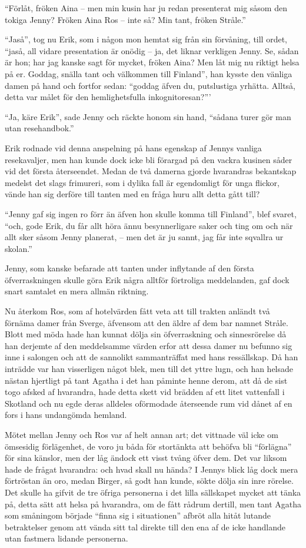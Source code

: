 ``Förlåt, fröken Aina -- men min kusin har ju redan presenterat mig
såsom den tokiga Jenny? Fröken Aina Ros -- inte så? Min tant, fröken
Stråle.''

``Jaså'', tog nu Erik, som i någon mon hemtat sig från sin förvåning,
till ordet, ``jaså, all vidare presentation är onödig -- ja, det liknar
verkligen Jenny. Se, sådan är hon; har jag kanske sagt för mycket,
fröken Aina? Men låt mig nu riktigt helsa på er. Goddag, snälla tant och
välkommen till Finland'', han kysste den vänliga damen på hand och
fortfor sedan: ``goddag äfven du, putslustiga yrhätta. Alltså, detta var
målet för den hemlighetsfulla inkognitoresan?'''

``Ja, käre Erik'', sade Jenny och räckte honom sin hand, ``sådana turer
gör man utan resehandbok.''

Erik rodnade vid denna anspelning på hans egenskap af Jennys vanliga
resekavaljer, men han kunde dock icke bli förargad på den vackra kusinen
såder vid det första återseendet. Medan de två damerna gjorde hvarandras
bekantskap medelst det slags frimureri, som i dylika fall är egendomligt
för unga flickor, vände han sig derföre till tanten med en fråga huru
allt detta gått till?

``Jenny gaf sig ingen ro förr än äfven hon skulle komma till Finland'',
blef svaret, ``och, gode Erik, du får allt höra ännu besynnerligare
saker och ting om och när allt sker såsom Jenny planerat, -- men det är
ju sannt, jag får inte sqvallra ur skolan.''

Jenny, som kanske befarade att tanten under inflytande af den första
öfverraskningen skulle göra Erik några alltför förtroliga meddelanden,
gaf dock snart samtalet en mera allmän riktning.

Nu återkom Ros, som af hotelvärden fått veta att till trakten anländt
två förnäma damer från Sverge, äfvensom att den äldre af dem bar namnet
Stråle. Blott med möda hade han kunnat dölja sin öfverraskning och
sinnesrörelse då han derjemte af den meddelsamme värden erfor att dessa
damer nu befunno sig inne i salongen och att de sannolikt sammanträffat
med hans ressällskap. Då han inträdde var han visserligen något blek,
men till det yttre lugn, och han helsade nästan hjertligt på tant Agatha
i det han påminte henne derom, att då de sist togo afsked af hvarandra,
hade detta skett vid brädden af ett litet vattenfall i Skotland och nu
egde deras alldeles oförmodade återseende rum vid dånet af en fors i
hans undangömda hemland.

Mötet mellan Jenny och Ros var af helt annan art; det vittnade väl icke
om ömsesidig förlägenhet, de voro ju båda för stortänkta att behöfva bli
``förlägna'' för sina känslor, men der låg ändock ett visst tvång öfver
dem. Det var liksom hade de frågat hvarandra: och hvad skall nu hända? I
Jennys blick låg dock mera förtröstan än oro, medan Birger, så godt han
kunde, sökte dölja sin inre rörelse. Det skulle ha gifvit de tre öfriga
personerna i det lilla sällskapet mycket att tänka på, detta sätt att
helsa på hvarandra, om de fått rådrum dertill, men tant Agatha som
småningom började ``finna sig i situationen'' afbröt alla hitåt lutande
betraktelser genom att vända sitt tal direkte till den ena af de icke
handlande utan fastmera lidande personerna.

